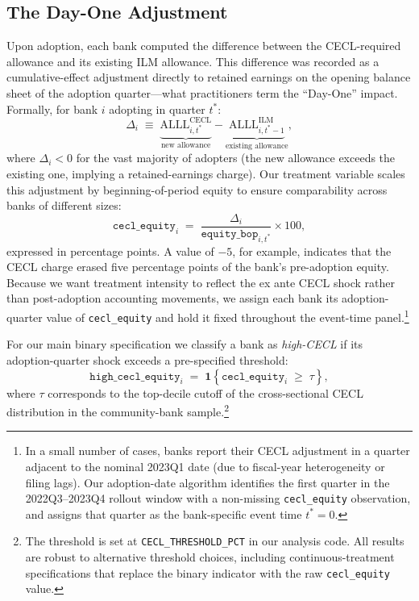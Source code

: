 \subsection{The Day-One Adjustment}
\label{sec:background:dayone}

Upon adoption, each bank computed the difference between the CECL-required
allowance and its existing ILM allowance. This difference was recorded as a
cumulative-effect adjustment directly to retained earnings on the opening balance
sheet of the adoption quarter—what practitioners term the ``Day-One'' impact.
Formally, for bank $i$ adopting in quarter $t^{*}$:
\begin{equation}
  \Delta_i \;\equiv\; \underbrace{\mathrm{ALLL}^{\mathrm{CECL}}_{i,t^{*}}}_{\text{new allowance}}
                    - \underbrace{\mathrm{ALLL}^{\mathrm{ILM}}_{i,t^{*}-1}}_{\text{existing allowance}},
  \label{eq:dayone}
\end{equation}
where $\Delta_i < 0$ for the vast majority of adopters (the new allowance exceeds
the existing one, implying a retained-earnings charge). Our treatment variable
scales this adjustment by beginning-of-period equity to ensure comparability
across banks of different sizes:
\begin{equation}
  \texttt{cecl\_equity}_{i}
  \;=\;
  \frac{\Delta_i}{\texttt{equity\_bop}_{i,t^{*}}}
  \times 100,
  \label{eq:treatment}
\end{equation}
expressed in percentage points. A value of $-5$, for example, indicates that
the CECL charge erased five percentage points of the bank's pre-adoption equity.
Because we want treatment intensity to reflect the ex ante CECL shock rather than
post-adoption accounting movements, we assign each bank its adoption-quarter
value of \texttt{cecl\_equity} and hold it fixed throughout the event-time
panel.\footnote{In a small number of cases, banks report their CECL adjustment in
a quarter adjacent to the nominal 2023Q1 date (due to fiscal-year heterogeneity
or filing lags). Our adoption-date algorithm identifies the first quarter in the
2022Q3–2023Q4 rollout window with a non-missing \texttt{cecl\_equity} observation,
and assigns that quarter as the bank-specific event time $t^{*}=0$.}

For our main binary specification we classify a bank as \textit{high-CECL} if
its adoption-quarter shock exceeds a pre-specified threshold:
\begin{equation}
  \texttt{high\_cecl\_equity}_{i}
  \;=\;
  \mathbf{1}\!\left\{
    \texttt{cecl\_equity}_{i} \;\geq\; \tau
  \right\},
  \label{eq:binary}
\end{equation}
where $\tau$ corresponds to the top-decile cutoff of the cross-sectional CECL
distribution in the community-bank sample.\footnote{The threshold is set at
\texttt{CECL\_THRESHOLD\_PCT} in our analysis code. All results are robust to
alternative threshold choices, including continuous-treatment specifications
that replace the binary indicator with the raw \texttt{cecl\_equity} value.}

